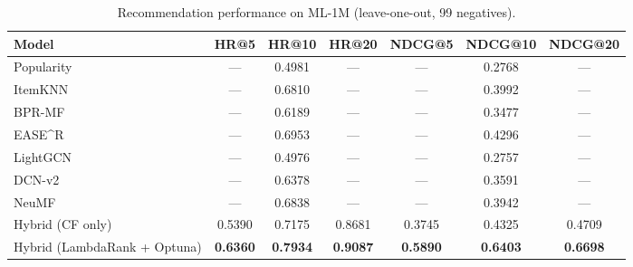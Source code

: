 \begin{table}[t]
\centering
\caption{Recommendation performance on ML-1M (leave-one-out, 99 negatives).}
\label{tab:results}
\begin{tabular}{lcccccc}
\toprule
Model & HR@5 & HR@10 & HR@20 & NDCG@5 & NDCG@10 & NDCG@20 \\
\midrule
Popularity & — & 0.4981 & — & — & 0.2768 & — \\
ItemKNN & — & 0.6810 & — & — & 0.3992 & — \\
BPR-MF & — & 0.6189 & — & — & 0.3477 & — \\
EASE\^{}R & — & 0.6953 & — & — & 0.4296 & — \\
LightGCN & — & 0.4976 & — & — & 0.2757 & — \\
DCN-v2 & — & 0.6378 & — & — & 0.3591 & — \\
NeuMF & — & 0.6838 & — & — & 0.3942 & — \\
\midrule
Hybrid (CF only) & 0.5390 & 0.7175 & 0.8681 & 0.3745 & 0.4325 & 0.4709 \\
Hybrid (LambdaRank + Optuna) & \textbf{0.6360} & \textbf{0.7934} & \textbf{0.9087} & \textbf{0.5890} & \textbf{0.6403} & \textbf{0.6698} \\
\bottomrule
\end{tabular}
\end{table}